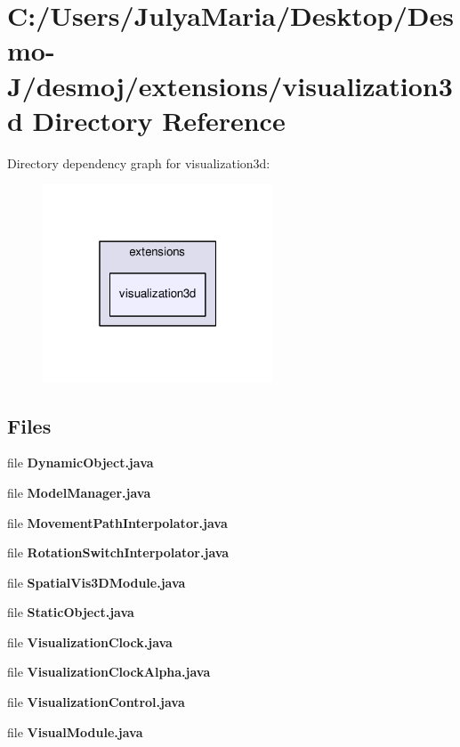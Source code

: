 \section{C\-:/\-Users/\-Julya\-Maria/\-Desktop/\-Desmo-\/\-J/desmoj/extensions/visualization3d Directory Reference}
\label{dir_42ecaee0854941ab35776625dfe40874}
Directory dependency graph for visualization3d\-:
\nopagebreak
\begin{figure}[H]
\begin{center}
\leavevmode
\includegraphics[width=194pt]{dir_42ecaee0854941ab35776625dfe40874_dep}
\end{center}
\end{figure}
\subsection*{Files}
\begin{DoxyCompactItemize}
\item 
file {\bfseries Dynamic\-Object.\-java}
\item 
file {\bfseries Model\-Manager.\-java}
\item 
file {\bfseries Movement\-Path\-Interpolator.\-java}
\item 
file {\bfseries Rotation\-Switch\-Interpolator.\-java}
\item 
file {\bfseries Spatial\-Vis3\-D\-Module.\-java}
\item 
file {\bfseries Static\-Object.\-java}
\item 
file {\bfseries Visualization\-Clock.\-java}
\item 
file {\bfseries Visualization\-Clock\-Alpha.\-java}
\item 
file {\bfseries Visualization\-Control.\-java}
\item 
file {\bfseries Visual\-Module.\-java}
\end{DoxyCompactItemize}
